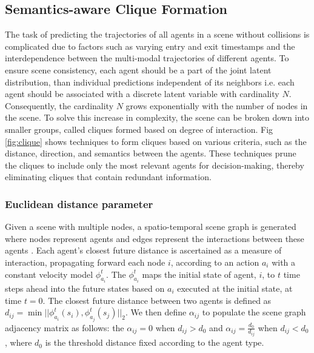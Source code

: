 \documentclass[letterpaper, 10 pt, conference]{ieeeconf}  %
\begin{document}
\subsection{Semantics-aware Clique Formation}
The task of predicting the trajectories of all agents in a scene  without collisions is complicated due to factors such as varying entry and exit timestamps and the interdependence between the multi-modal trajectories of different agents. To ensure scene consistency, each agent should be a part of the joint latent distribution, than individual predictions independent of its neighbors i.e. each agent should be associated with a discrete latent variable with cardinality $N$. Consequently, the cardinality $N$ grows exponentially with the number of nodes in the scene. To solve this increase in complexity, the scene can be broken down into smaller groups, called cliques formed based on degree of interaction. Fig \ref{fig:clique} shows techniques to form cliques based on various criteria, such as the distance, direction, and semantics between the agents. These techniques prune the cliques to include only the most relevant agents for decision-making, thereby eliminating cliques that contain redundant information.
\subsubsection{Euclidean distance parameter} 
Given a scene with multiple nodes, a spatio-temporal scene graph is generated where nodes represent agents and edges represent the interactions between these agents \cite{chen2022scept}. Each agent’s closest future distance is ascertained as a measure of interaction, propagating forward each node $i$, according to an action $a_i$ with a constant velocity model $\phi_{a_i}^t$. The $\phi_{a_i}^t$ maps the initial state of agent, $i$, to $t$ time steps ahead into the future states based on $a_i$ executed at the initial state, at time $t=0$. %
The closest future distance between two agents is defined as $d_{ij} = \min ||\phi_{a_i}^t(s_i), \phi_{a_j}^t(s_j)||_2$. We then define $\alpha_{ij}$ to populate the scene graph adjacency matrix as follows: the $\alpha_{ij} =0$ when $d_{ij} > d_0$ and $\alpha_{ij} =\frac{d_0}{d_{ij}}$ when $d_{ij} < d_0$, where $d_0$ is the threshold distance fixed according to the agent type. 
     
\end{document}
